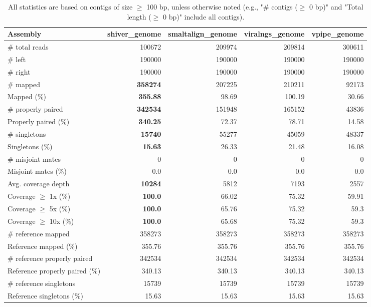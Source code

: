 \documentclass[12pt,a4paper]{article}
\begin{document}
\begin{table}[ht]
\begin{center}
\caption{All statistics are based on contigs of size $\geq$ 100 bp, unless otherwise noted (e.g., "\# contigs ($\geq$ 0 bp)" and "Total length ($\geq$ 0 bp)" include all contigs).}
\begin{tabular}{|l*{4}{|r}|}
\hline
Assembly & shiver\_genome & smaltalign\_genome & viralngs\_genome & vpipe\_genome \\ \hline
\# total reads & 100672 & 209974 & 209814 & 300611 \\ \hline
\# left & 190000 & 190000 & 190000 & 190000 \\ \hline
\# right & 190000 & 190000 & 190000 & 190000 \\ \hline
\# mapped & {\bf 358274} & 207225 & 210211 & 92173 \\ \hline
Mapped (\%) & {\bf 355.88} & 98.69 & 100.19 & 30.66 \\ \hline
\# properly paired & {\bf 342534} & 151948 & 165152 & 43836 \\ \hline
Properly paired (\%) & {\bf 340.25} & 72.37 & 78.71 & 14.58 \\ \hline
\# singletons & {\bf 15740} & 55277 & 45059 & 48337 \\ \hline
Singletons (\%) & {\bf 15.63} & 26.33 & 21.48 & 16.08 \\ \hline
\# misjoint mates & 0 & 0 & 0 & 0 \\ \hline
Misjoint mates (\%) & 0.0 & 0.0 & 0.0 & 0.0 \\ \hline
Avg. coverage depth & {\bf 10284} & 5812 & 7193 & 2557 \\ \hline
Coverage $\geq$ 1x (\%) & {\bf 100.0} & 66.02 & 75.32 & 59.91 \\ \hline
Coverage $\geq$ 5x (\%) & {\bf 100.0} & 65.76 & 75.32 & 59.3 \\ \hline
Coverage $\geq$ 10x (\%) & {\bf 100.0} & 65.68 & 75.32 & 59.3 \\ \hline
\# reference mapped & 358273 & 358273 & 358273 & 358273 \\ \hline
Reference mapped (\%) & 355.76 & 355.76 & 355.76 & 355.76 \\ \hline
\# reference properly paired & 342534 & 342534 & 342534 & 342534 \\ \hline
Reference properly paired (\%) & 340.13 & 340.13 & 340.13 & 340.13 \\ \hline
\# reference singletons & 15739 & 15739 & 15739 & 15739 \\ \hline
Reference singletons (\%) & 15.63 & 15.63 & 15.63 & 15.63 \\ \hline

\end{tabular}
\end{center}
\end{table}
\end{document}
